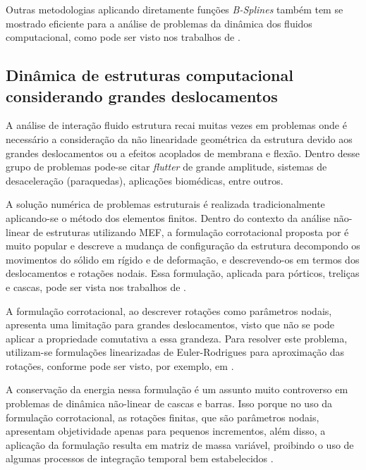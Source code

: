 \documentclass[tese_patricia.tex]{subfiles}
\begin{document}
Outras metodologias aplicando diretamente funções \textit{B-Splines} também tem se mostrado eficiente para a análise de problemas da dinâmica dos fluidos computacional, como pode ser visto nos trabalhos de .


\subsection{Dinâmica de estruturas computacional considerando grandes deslocamentos}
\label{csdsection}

A análise de interação fluido estrutura recai muitas vezes em problemas onde é necessário a consideração da não linearidade geométrica da estrutura devido aos grandes deslocamentos ou a efeitos acoplados de membrana e flexão. Dentro desse grupo de problemas pode-se citar \textit{flutter} de grande amplitude, sistemas de desaceleração (paraquedas), aplicações biomédicas, entre outros.

A solução numérica de problemas estruturais é realizada tradicionalmente aplicando-se o método dos elementos finitos. Dentro do contexto da análise não-linear de estruturas utilizando MEF, a formulação corrotacional proposta por  é muito popular e descreve a mudança de configuração da estrutura decompondo os movimentos do sólido em rígido e de deformação, e descrevendo-os em termos dos deslocamentos e rotações nodais. Essa formulação, aplicada para pórticos, treliças e cascas, pode ser vista nos trabalhos de .

A formulação corrotacional, ao descrever rotações como parâmetros nodais, apresenta uma limitação para grandes deslocamentos, visto que não se pode aplicar a propriedade comutativa a essa grandeza. Para resolver este problema, utilizam-se formulações linearizadas de Euler-Rodrigues para aproximação das rotações, conforme pode ser visto, por exemplo, em .

A conservação da energia nessa formulação é um assunto muito controverso em problemas de dinâmica não-linear de cascas e barras. Isso porque no uso da formulação corrotacional, as rotações finitas, que são parâmetros nodais, apresentam objetividade apenas para pequenos incrementos, além disso, a aplicação da formulação resulta em matriz de massa variável, proibindo o uso de algumas processos de integração temporal bem estabelecidos \cite{SanchesC:2013}.
\end{document}

